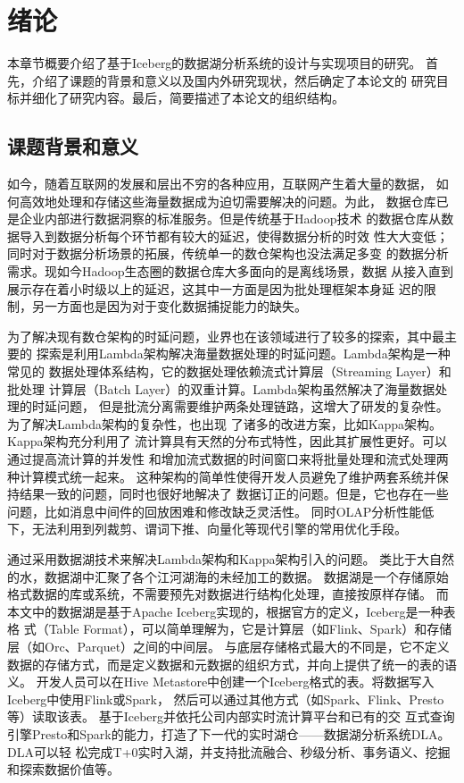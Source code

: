 
\chapter{绪论}

本章节概要介绍了基于Iceberg的数据湖分析系统的设计与实现项目的研究。
首先，介绍了课题的背景和意义以及国内外研究现状，然后确定了本论文的
研究目标并细化了研究内容。最后，简要描述了本论文的组织结构。

\section{课题背景和意义}

如今，随着互联网的发展和层出不穷的各种应用，互联网产生着大量的数据，
如何高效地处理和存储这些海量数据成为迫切需要解决的问题\cite{1}。为此，
数据仓库已是企业内部进行数据洞察的标准服务。但是传统基于Hadoop技术\cite{2}
的数据仓库从数据导入到数据分析每个环节都有较大的延迟，使得数据分析的时效
性大大变低；同时对于数据分析场景的拓展，传统单一的数仓架构也没法满足多变
的数据分析需求。现如今Hadoop生态圈的数据仓库大多面向的是离线场景，数据
从接入直到展示存在着小时级以上的延迟，这其中一方面是因为批处理框架本身延
迟的限制，另一方面也是因为对于变化数据捕捉能力的缺失。

为了解决现有数仓架构的时延问题，业界也在该领域进行了较多的探索，其中最主要的
探索是利用Lambda架构\cite{3}解决海量数据处理的时延问题。Lambda架构是一种常见的
数据处理体系结构，它的数据处理依赖流式计算层（Streaming Layer）和批处理
计算层（Batch Layer）的双重计算。Lambda架构虽然解决了海量数据处理的时延问题，
但是批流分离需要维护两条处理链路，这增大了研发的复杂性。为了解决Lambda架构的复杂性，也出现
了诸多的改进方案，比如Kappa架构\cite{4}。Kappa架构充分利用了
流计算具有天然的分布式特性，因此其扩展性更好。可以通过提高流计算的并发性
和增加流式数据的时间窗口来将批量处理和流式处理两种计算模式统一起来。
这种架构的简单性使得开发人员避免了维护两套系统并保持结果一致的问题，同时也很好地解决了
数据订正的问题。但是，它也存在一些问题，比如消息中间件的回放困难和修改缺乏灵活性。
同时OLAP分析性能低下，无法利用到列裁剪、谓词下推、向量化等现代引擎的常用优化手段。

通过采用数据湖技术来解决Lambda架构和Kappa架构引入的问题。
类比于大自然的水，数据湖中汇聚了各个江河湖海的未经加工的数据。
数据湖是一个存储原始格式数据的库或系统，不需要预先对数据进行结构化处理，直接按原样存储\cite{5,6,7,8}。
而本文中的数据湖是基于Apache Iceberg实现的，根据官方的定义，Iceberg是一种表格
式（Table Format），可以简单理解为，它是计算层（如Flink、Spark）和存储层（如Orc\cite{9}、Parquet\cite{10}）之间的中间层。
与底层存储格式最大的不同是，它不定义数据的存储方式，而是定义数据和元数据的组织方式，并向上提供了统一的表的语义。
开发人员可以在Hive Metastore中创建一个Iceberg格式的表。将数据写入Iceberg中使用Flink或Spark，
然后可以通过其他方式（如Spark、Flink、Presto\cite{11}等）读取该表。
基于Iceberg并依托公司内部实时流计算平台和已有的交
互式查询引擎Presto和Spark的能力，打造了下一代的实时湖仓——数据湖分析系统DLA。DLA可以轻
松完成T+0实时入湖，并支持批流融合、秒级分析、事务语义、挖掘和探索数据价值等。

